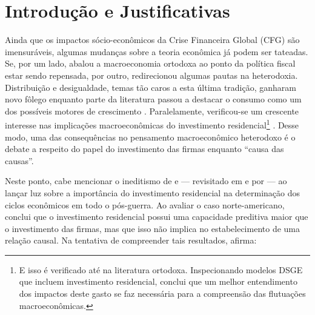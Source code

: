\section{Introdução e Justificativas}\label{Intro}



Ainda que os impactos sócio-econômicos da Crise Financeira Global (CFG) são imensuráveis, algumas mudanças sobre a teoria econômica já podem ser tateadas. Se, por um lado, abalou a macroeconomia ortodoxa ao ponto da política fiscal estar sendo repensada, por outro, redirecionou algumas pautas na heterodoxia. Distribuição e desigualdade, temas tão caros a esta última tradição, ganharam novo fôlego \cites{carvalho_personal_2016}{ederer_will_2019} enquanto parte da literatura passou a destacar o consumo como um dos possíveis motores de crescimento \cite{brochier_macroeconomics_2017}. Paralelamente, verificou-se um crescente interesse nas implicações macroeconômicas do investimento residencial\footnote{E isso é verificado até na literatura ortodoxa. Inspecionando modelos DSGE que incluem investimento residencial, \textcite{iacoviello_housing_2010} conclui que um melhor entendimento dos impactos deste gasto se faz necessária para a compreensão das flutuações macroeconômicas. } \cite{fiebiger_semi-autonomous_2018}. Desse modo, uma das consequências no pensamento macroeconômico heterodoxo é o debate a respeito do papel do investimento das firmas enquanto ``causa das causas''.

Neste ponto, cabe mencionar o ineditismo de \textcite{green_follow_1997} e \textcite{leamer_housing_2007} --- revisitado em \textcite{leamer_housing_2015} e por \textcite{fiebiger_trend_2017} --- ao lançar luz sobre a importância do investimento residencial na determinação dos ciclos econômicos em todo o pós-guerra. Ao avaliar o caso norte-americano, \textcite{green_follow_1997} conclui que o investimento residencial possui uma capacidade preditiva maior que o investimento das firmas, mas que isso não implica no estabelecimento de uma relação causal. Na tentativa de compreender tais resultados, afirma:

